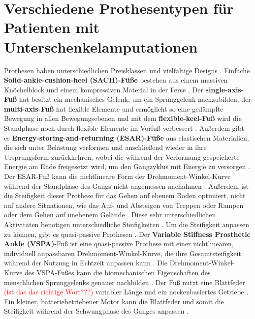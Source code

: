 \section{Verschiedene Prothesentypen für Patienten mit Unterschenkelamputationen}  %
Prothesen haben unterschiedlichen Preisklassen und vielfältige Designs \cite{Stevens.2018}.
Einfache \textbf{Solid-ankle-cushion-heel (SACH)-Füße} bestehen aus einem massiven Knöchelblock und einem kompressiven Material in der Ferse \cite{Stevens.2018}. Der \textbf{single-axis-Fuß} hat besitzt ein mechanisches Gelenk, um ein Sprunggelenk nachzubilden, der \textbf{multi-axis-Fuß} hat flexible Elemente und ermöglicht so eine gedämpfte Bewegung in allen Bewegungsebenen und mit dem \textbf{flexible-keel-Fuß} wird die Standphase noch durch flexible Elemente im Vorfuß verbessert \cite{Stevens.2018}. 
Außerdem gibt es \textbf{Energy-storing-and-returning (ESAR)-Füße} aus elastischen Materialien, die sich unter Belastung verformen und anschließend wieder in ihre Ursprungsform zurückkehren, wobei die während der Verformung gespeicherte Energie am Ende freigesetzt wird, um den Gangzyklus mit Energie zu versorgen \cite{Stevens.2018}. 
Der ESAR-Fuß kann die nichtlineare Form der Drehmoment-Winkel-Kurve während der Standphase des Gangs nicht angemessen nachahmen \cite{Shepherd.2017}. Außerdem ist die Steifigkeit dieser Prothese für das Gehen auf ebenem Boden optimiert, nicht auf andere Situationen, wie das Auf- und Absteigen von Treppen oder Rampen oder dem Gehen auf unebenem Gelände \cite{Shepherd.2017}. Diese sehr unterschiedlichen Aktivitäten benötigen unterschiedliche Steifigkeiten \cite{Shepherd.2017}. Um die Steifigkeit anpassen zu können, gibt es quasi-passive Prothesen \cite{Shepherd.2017}. 
Der \textbf{Variable Stiffness Prosthetic Ankle (VSPA)}-Fuß ist eine quasi-passive Prothese mit einer nichtlinearen, individuell anpassbaren Drehmoment-Winkel-Kurve, die ihre Gesamtsteifigkeit während der Nutzung in Echtzeit anpassen kann \cite{Shepherd.2017}. Die Drehmoment-Winkel-Kurve des VSPA-Fußes kann die biomechanischen Eigenschaften des menschlichen Sprunggelenks genauer nachbilden \cite{Shepherd.2017}. Der Fuß nutzt eine Blattfeder \textcolor{red}{(ist das das richtige Wort???)} variabler Länge und ein nockenbasiertes Getriebe \cite{Shetty.2022}. Ein kleiner, batteriebetriebener Motor kann die Blattfeder und somit die Steifigkeit während der Schwungphase des Ganges anpassen \cite{Shetty.2022}. %


